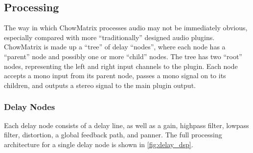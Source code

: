\documentclass[landscape,twocolumn,a5paper]{manual}
\begin{document}
\subsection{Processing}
The way in which ChowMatrix processes audio may not
be immediately obvious, especially compared with more
``traditionally'' designed audio plugins. ChowMatrix is
made up a ``tree'' of delay ``nodes'', where each node has
a ``parent'' node and possibly one or more ``child'' nodes.
The tree has two ``root'' nodes, representing the left and right
input channels to the plugin. Each node accepts a mono input
from its parent node, passes a mono signal on to its children,
and outputs a stereo signal to the main plugin output.

\subsubsection{Delay Nodes}
Each delay node consists of a delay line, as well as a gain,
highpass filter, lowpass filter, distortion, a global feedback
path, and panner. The full processing architecture for a single
delay node is shown in \cref{fig:delay_dsp}.
\newpar
%
\end{document}
